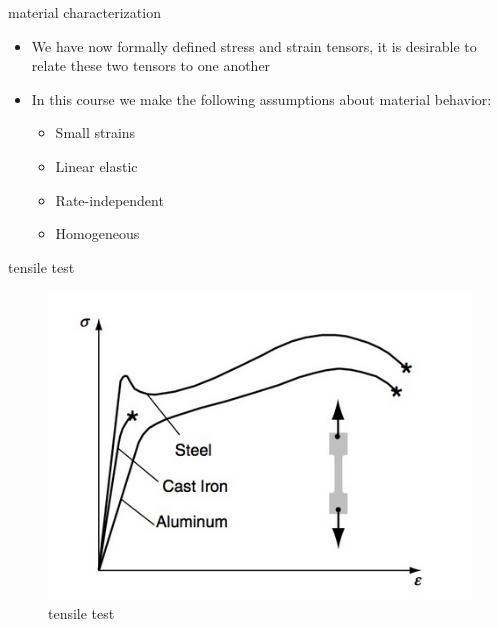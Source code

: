 \documentclass[
  letterpaper,
  ignorenonframetext,
  aspectratio=43,
  handout,
  12pt]{beamer}
\providecommand{\tightlist}{%
  \setlength{\itemsep}{0pt}\setlength{\parskip}{0pt}}
\providecommand{\tightlist}{%
\setlength{\itemsep}{0pt}\setlength{\parskip}{0pt}}
\let\Oldincludegraphics\includegraphics
\renewcommand{\includegraphics}[2][]{\Oldincludegraphics[width=\textwidth,height=0.7\textheight,keepaspectratio]{#2}}
\begin{document}
\begin{frame}{material characterization}
\protect\hypertarget{material-characterization-1}{}
\begin{itemize}
\tightlist
\item
  We have now formally defined stress and strain tensors, it is
  desirable to relate these two tensors to one another
\item
  In this course we make the following assumptions about material
  behavior:

  \begin{itemize}
  \tightlist
  \item
    Small strains
  \item
    Linear elastic
  \item
    Rate-independent
  \item
    Homogeneous
  \end{itemize}
\end{itemize}
\end{frame}

\begin{frame}{tensile test}
\protect\hypertarget{tensile-test}{}
\begin{figure}
\centering
\includegraphics{../images/tensile_test.PNG}
\caption{tensile test}
\end{figure}
\end{frame}
\end{document}

